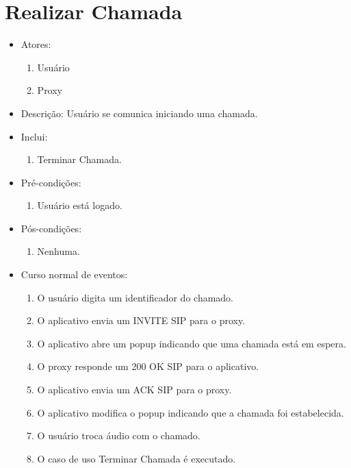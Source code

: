 \documentclass[12pt,a4paper]{article}
\begin{document}
\section{Realizar Chamada}
\begin{itemize}
	\item Atores:
	\begin{enumerate}
		\item Usu\'{a}rio
		\item Proxy
	\end{enumerate}
	\item Descri\c{c}\~{a}o: Usu\'{a}rio se comunica iniciando uma chamada.
	\item Inclui:
	\begin{enumerate}
        \item Terminar Chamada.
	\end{enumerate}
	\item Pr\'{e}-condi\c{c}\~{o}es:
	\begin{enumerate}
		\item Usu\'{a}rio est\'{a} logado.
	\end{enumerate}
	\item P\'{o}s-condi\c{c}\~{o}es:
	\begin{enumerate}
		\item Nenhuma.
	\end{enumerate}
	\item Curso normal de eventos:
	\begin{enumerate}
        \item O usu\'{a}rio digita um identificador do chamado.
        \item O aplicativo envia um INVITE SIP para o proxy.
        \item O aplicativo abre um popup indicando que uma chamada est\'{a} em espera.
        \item O proxy responde um 200 OK SIP para o aplicativo.
        \item O aplicativo envia um ACK SIP para o proxy.
        \item O aplicativo modifica o popup indicando que a chamada foi estabelecida.
        \item O usu\'{a}rio troca \'{a}udio com o chamado.
        \item O caso de uso Terminar Chamada \'{e} executado.
	\end{enumerate}	
\end{itemize}
\end{document}

